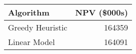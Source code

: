 \begin{tabular}{lr}
\hline
Algorithm & NPV (\$000s) \\
\hline
Greedy Heuristic & 164359 \\
Linear Model & 164091 \\
\hline
\end{tabular}
